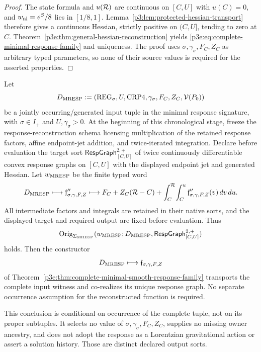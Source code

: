 \documentclass[12pt,a4paper]{article}
\begin{document}
\begin{proof}
The state formula and \(u(\mathcal R)\) are continuous on \([C,U]\) with
\(u(C)=0\), and \(w_{\rm nl}=e^{S}/8\) lies in \([1/8,1]\).
Lemma~\ref{p3:lem:protected-hessian-transport} therefore gives a continuous
Hessian, strictly positive on \((C,U]\), tending to zero at \(C\).
Theorem~\ref{p3e:thm:general-hessian-reconstruction} yields
\eqref{p3e:eq:complete-minimal-response-family} and uniqueness.  The proof
uses \(\sigma,\gamma_\sigma,F_C,Z_C\) as arbitrary typed parameters, so none
of their source values is required for the asserted properties.
\end{proof}

\begin{corollary}
\label{p3e:cor:mresp-composite-witness-transport}
Let
\[
 D_{\rm MRESP}
 :=(\mathrm{REG}_\sigma,U,\mathrm{CRP4},
    \gamma_\sigma,F_C,Z_C,\mathcal V(P_0))
\]
be a jointly occurring/generated input tuple in the minimal response
signature, with
\(\sigma\in I_+\) and \(U,\gamma_\sigma>0\).  At the beginning of this
chronological stage, freeze the response-reconstruction schema licensing
multiplication of the retained response factors, affine endpoint-jet
addition, and twice-iterated integration.  Declare before evaluation the
target sort \(\mathsf{RespGraph}_{[C,U]}^{2,+}\) of twice continuously
differentiable convex response graphs on \([C,U]\) with the displayed endpoint
jet and generated Hessian.  Let \(w_{\rm MRESP}\) be the finite typed word
\[
 D_{\rm MRESP}\longmapsto
 \mathfrak f''_{\sigma,\gamma,F,Z}
 \longmapsto
 F_C+Z_C(\mathcal R-C)
 +\int_C^\mathcal R\!\int_C^u
   \mathfrak f''_{\sigma,\gamma,F,Z}(v)\,dv\,du .
\]
All intermediate factors and integrals are retained in their native sorts,
and the displayed target and required output are fixed before evaluation.
Thus
\[
 \operatorname{Orig}_{\Sigma_{\rm MRESP}}
 (w_{\rm MRESP};D_{\rm MRESP},
  \mathsf{RespGraph}_{[C,U]}^{2,+})
\]
holds.  Then the constructor
\[
 D_{\rm MRESP}\longmapsto
 \mathfrak f_{\sigma,\gamma,F,Z}
\]
of Theorem~\ref{p3e:thm:complete-minimal-smooth-response-family} transports
the complete input witness and co-realizes its unique response graph.  No
separate occurrence assumption for the reconstructed function is required.

This conclusion is conditional on occurrence of the complete tuple, not on
its proper subtuples.  It selects no value of
\(\sigma,\gamma_\sigma,F_C,Z_C\), supplies no missing owner ancestry, and
does not adopt the response as a Lorentzian gravitational action or assert a
solution history.  Those are distinct declared output sorts.
\end{corollary}
\end{document}

